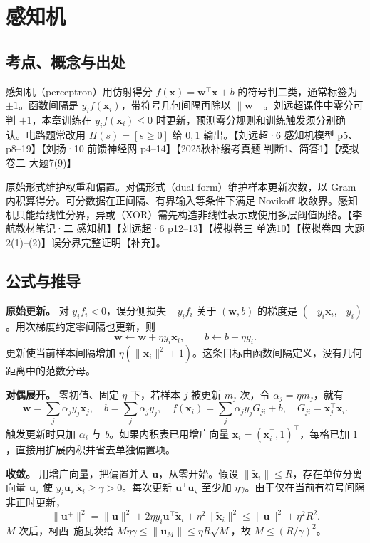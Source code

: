 \documentclass[UTF8,a4paper,zihao=-4,fontset=fandol]{ctexart}
\begin{document}
\section{感知机}
\subsection{考点、概念与出处}
感知机（perceptron）用仿射得分 \(f(\bm x)=\bm w^\top\bm x+b\) 的符号判二类，通常标签为 \(\pm1\)。函数间隔是 \(y_if(\bm x_i)\)，带符号几何间隔再除以 \(\|\bm w\|\)。刘远超课件中零分可判 \(+1\)，本章训练在 \(y_if(\bm x_i)\le0\) 时更新，预测零分规则和训练触发须分别确认。电路题常改用 \(H(s)=[s\ge0]\) 给 \(0,1\) 输出。【刘远超·6 感知机模型 p5、p8--19】【刘扬·10 前馈神经网 p4--14】【2025秋补缓考真题 判断1、简答1】【模拟卷二 大题7(9)】
 
原始形式维护权重和偏置。对偶形式（dual form）维护样本更新次数，以 Gram 内积算得分。可分数据在正间隔、有界输入等条件下满足 Novikoff 收敛界。感知机只能给线性分界，异或（XOR）需先构造非线性表示或使用多层阈值网络。【李航教材笔记·二 感知机】【刘远超·6 p12--13】【模拟卷三 单选10】【模拟卷四 大题2(1)--(2)】误分界完整证明【补充】。

\subsection{公式与推导}
\textbf{原始更新。} 对 \(y_if_i<0\)，误分侧损失 \(-y_if_i\) 关于 \((\bm w,b)\) 的梯度是 \((-y_i\bm x_i,-y_i)\)。用次梯度约定零间隔也更新，则
\[
 \bm w\gets\bm w+\eta y_i\bm x_i,\qquad b\gets b+\eta y_i.
\]
更新使当前样本间隔增加 \(\eta(\|\bm x_i\|^2+1)\)。这条目标由函数间隔定义，没有几何距离中的范数分母。
 
\textbf{对偶展开。} 零初值、固定 \(\eta\) 下，若样本 \(j\) 被更新 \(m_j\) 次，令 \(\alpha_j=\eta m_j\)，就有
\[
 \bm w=\sum_j\alpha_jy_j\bm x_j,\quad b=\sum_j\alpha_jy_j,\quad
 f(\bm x_i)=\sum_j\alpha_jy_j G_{ji}+b,\quad G_{ji}=\bm x_j^\top\bm x_i.
\]
触发更新时只加 \(\alpha_i\) 与 \(b\)。如果内积表已用增广向量 \(\tilde{\bm x}_i=(\bm x_i^\top,1)^\top\)，每格已加 \(1\)，直接用扩展内积并省去单独偏置项。
 
\textbf{收敛。} 用增广向量，把偏置并入 \(\bm u\)，从零开始。假设 \(\|\tilde{\bm x}_i\|\le R\)，存在单位分离向量 \(\bm u_\star\) 使 \(y_i\bm u_\star^\top\tilde{\bm x}_i\ge\gamma>0\)。每次更新 \(\bm u^\top\bm u_\star\) 至少加 \(\eta\gamma\)。由于仅在当前有符号间隔非正时更新，
\[
 \|\bm u^+\|^2=\|\bm u\|^2+2\eta y_i\bm u^\top\tilde{\bm x}_i+\eta^2\|\tilde{\bm x}_i\|^2
 \le\|\bm u\|^2+\eta^2R^2.
\]
\(M\) 次后，柯西--施瓦茨给 \(M\eta\gamma\le\|\bm u_M\|\le\eta R\sqrt M\)，故 \(M\le(R/\gamma)^2\)。
 
\end{document}
